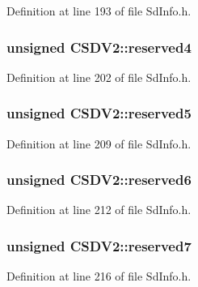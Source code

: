 Definition at line 193 of file Sd\+Info.\+h.

\subsubsection[{\texorpdfstring{reserved4}{reserved4}}]{\setlength{\rightskip}{0pt plus 5cm}unsigned C\+S\+D\+V2\+::reserved4}\hypertarget{struct_c_s_d_v2_a4f474cd2339283c9a2224eb1259c8e53}{}\label{struct_c_s_d_v2_a4f474cd2339283c9a2224eb1259c8e53}


Definition at line 202 of file Sd\+Info.\+h.

\subsubsection[{\texorpdfstring{reserved5}{reserved5}}]{\setlength{\rightskip}{0pt plus 5cm}unsigned C\+S\+D\+V2\+::reserved5}\hypertarget{struct_c_s_d_v2_a6beffc3766b7f6cd658e3dad5b7e12f7}{}\label{struct_c_s_d_v2_a6beffc3766b7f6cd658e3dad5b7e12f7}


Definition at line 209 of file Sd\+Info.\+h.

\subsubsection[{\texorpdfstring{reserved6}{reserved6}}]{\setlength{\rightskip}{0pt plus 5cm}unsigned C\+S\+D\+V2\+::reserved6}\hypertarget{struct_c_s_d_v2_ac401478963e75077602ad0ca9f93c98a}{}\label{struct_c_s_d_v2_ac401478963e75077602ad0ca9f93c98a}


Definition at line 212 of file Sd\+Info.\+h.

\subsubsection[{\texorpdfstring{reserved7}{reserved7}}]{\setlength{\rightskip}{0pt plus 5cm}unsigned C\+S\+D\+V2\+::reserved7}\hypertarget{struct_c_s_d_v2_a10ae8595e043b636b4aeaedcefaa4f97}{}\label{struct_c_s_d_v2_a10ae8595e043b636b4aeaedcefaa4f97}


Definition at line 216 of file Sd\+Info.\+h.

